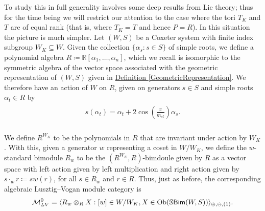\noindent To study this in full generality involves some deep results from Lie theory; thus for the time being we will restrict our attention to the case where the tori $T_K$ and $T$ are of equal rank (that is, where $T_K = T$ and hence $P = R$). In this situation the picture is much simpler. Let $(W, S)$ be a Coxeter system with finite index subgroup $W_K \subseteq W$. Given the collection $\{\alpha_s : s \in S\}$ of simple roots, we define a polynomial algebra $R \coloneqq \mathbb{R}[\alpha_1, \dots, \alpha_n]$, which we recall is isomorphic to the symmetric algebra of the vector space associated with the geometric representation of $(W, S)$ given in \hyperref[GeometricRepresentation]{Definition \ref*{GeometricRepresentation}}. We therefore have an action of $W$ on $R$, given on generators $s \in S$ and simple roots $\alpha_t \in R$ by\\[-1.1\linespacing]
\begin{align*}
\begin{split}
s(\alpha_t) = \alpha_t + 2\cos\!\left(\frac{\pi}{m_{st}}\right)\!\alpha_s.
\end{split}
\end{align*}
\noindent\\[-0.6\linespacing] We define $R^{W_K}$ to be the polynomials in $R$ that are invariant under action by $W_K$. With this, given a generator $w$ representing a coset in $W/W_K$, we define the $w$-standard bimodule $R_w$ to be the $(R^{W_K}, R)$-bimdoule given by $R$ as a vector space with left action given by left multiplication and right action given by $s \cdot_w r \coloneqq s w(r)$, for all $s \in R_w$ and $r \in R$. Thus, just as before, the corresponding algebraic Lusztig--Vogan module category is
\begin{align*}
\begin{split}
\mathcal{M}_{LV}^0 = \langle R_w \otimes_R X : [w] \in W/W_K, X \in \textnormal{Ob}(\mathbb{S}\textnormal{\textsf{Bim}}(W, S))\rangle_{\oplus,\ominus,(1)}.
\end{split}
\end{align*}
\newpage

